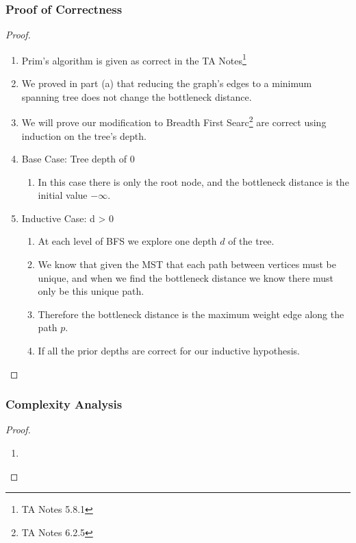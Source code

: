 \documentclass{article}
\begin{document}
\subsubsection{Proof of Correctness}
\begin{proof}
      \begin{enumerate}
            \item Prim's algorithm is given as correct in the TA Notes\footnote{TA Notes 5.8.1}
            \item We proved in part (a) that reducing the graph's edges to a minimum
                  spanning tree does not change the bottleneck distance.
            \item We will prove our modification to Breadth First Searc\footnote{TA Notes
                        6.2.5} are correct using induction on the tree's depth.
            \item Base Case: Tree depth of 0 \begin{enumerate}
                        \item In this case there is only the root node, and the bottleneck
                              distance is the initial value \(-\infty \).
                  \end{enumerate}
            \item Inductive Case:  d > 0\begin{enumerate}
                        \item At each level of BFS we explore one depth \(d\) of the tree.
                        \item We know that given the MST that each path between vertices
                              must be unique, and when we find the bottleneck distance we
                              know there must only be this unique path.
                        \item Therefore the bottleneck distance is the maximum weight edge
                              along the path \(p\).
                        \item If all the prior depths are correct for our inductive
                              hypothesis.
                  \end{enumerate}
      \end{enumerate}
\end{proof}

\subsubsection{Complexity Analysis}
\begin{proof}
      \begin{enumerate}
            \item
      \end{enumerate}
\end{proof}
\end{document}

